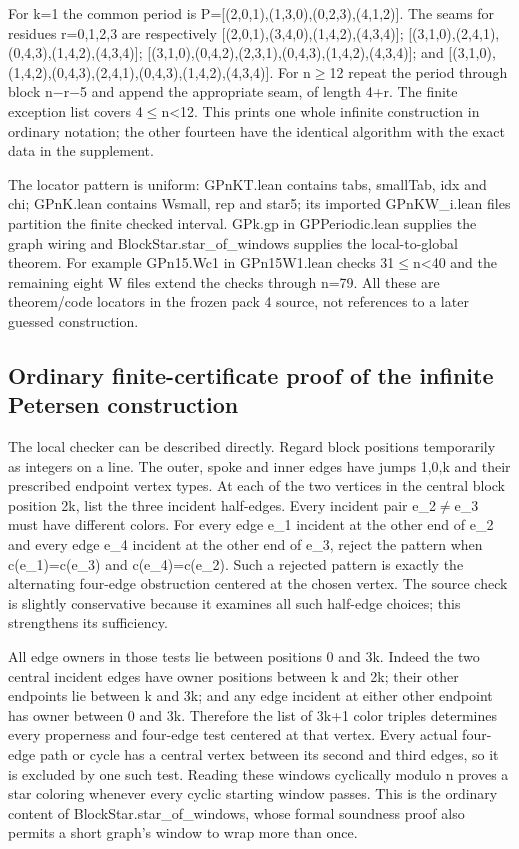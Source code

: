 \documentclass[11pt,a4paper]{article}
\begin{document}
For k=1 the common period is P=[(2,0,1),(1,3,0),(0,2,3),(4,1,2)]. The seams for residues r=0,1,2,3 are respectively [(2,0,1),(3,4,0),(1,4,2),(4,3,4)]; [(3,1,0),(2,4,1),(0,4,3),(1,4,2),(4,3,4)]; [(3,1,0),(0,4,2),(2,3,1),(0,4,3),(1,4,2),(4,3,4)]; and [(3,1,0),(1,4,2),(0,4,3),(2,4,1),(0,4,3),(1,4,2),(4,3,4)]. For n\ensuremath{\geq}12 repeat the period through block n\ensuremath{-}r\ensuremath{-}5 and append the appropriate seam, of length 4+r. The finite exception list covers 4\ensuremath{\leq}n<12. This prints one whole infinite construction in ordinary notation; the other fourteen have the identical algorithm with the exact data in the supplement.

The locator pattern is uniform: GPnKT.lean contains tabs, smallTab, idx and chi; GPnK.lean contains Wsmall, rep and star5; its imported GPnKW\_i.lean files partition the finite checked interval. GPk.gp in GPPeriodic.lean supplies the graph wiring and BlockStar.star\_of\_windows supplies the local-to-global theorem. For example GPn15.Wc1 in GPn15W1.lean checks 31\ensuremath{\leq}n<40 and the remaining eight W files extend the checks through n=79. All these are theorem/code locators in the frozen pack 4 source, not references to a later guessed construction.

\subsection{Ordinary finite-certificate proof of the infinite Petersen construction}
The local checker can be described directly. Regard block positions temporarily as integers on a line. The outer, spoke and inner edges have jumps 1,0,k and their prescribed endpoint vertex types. At each of the two vertices in the central block position 2k, list the three incident half-edges. Every incident pair e\_2\ensuremath{\neq}e\_3 must have different colors. For every edge e\_1 incident at the other end of e\_2 and every edge e\_4 incident at the other end of e\_3, reject the pattern when c(e\_1)=c(e\_3) and c(e\_4)=c(e\_2). Such a rejected pattern is exactly the alternating four-edge obstruction centered at the chosen vertex. The source check is slightly conservative because it examines all such half-edge choices; this strengthens its sufficiency.

All edge owners in those tests lie between positions 0 and 3k. Indeed the two central incident edges have owner positions between k and 2k; their other endpoints lie between k and 3k; and any edge incident at either other endpoint has owner between 0 and 3k. Therefore the list of 3k+1 color triples determines every properness and four-edge test centered at that vertex. Every actual four-edge path or cycle has a central vertex between its second and third edges, so it is excluded by one such test. Reading these windows cyclically modulo n proves a star coloring whenever every cyclic starting window passes. This is the ordinary content of BlockStar.star\_of\_windows, whose formal soundness proof also permits a short graph's window to wrap more than once.
\end{document}

